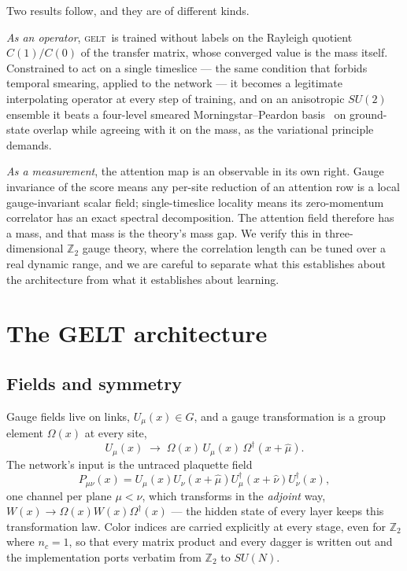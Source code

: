 \documentclass[aps,prl,reprint,superscriptaddress,nofootinbib]{revtex4-2}
\newcommand{\Zt}{\mathbb{Z}_2}
\newcommand{\GELT}{\textsc{gelt}}
\begin{document}
Two results follow, and they are of different kinds.

\emph{As an operator}, \GELT\ is trained without labels on the Rayleigh quotient
$C(1)/C(0)$ of the transfer matrix, whose converged value is the mass itself.
Constrained to act on a single timeslice --- the same condition that forbids
temporal smearing, applied to the network --- it becomes a legitimate
interpolating operator at every step of training, and on an anisotropic $SU(2)$
ensemble it beats a four-level smeared Morningstar--Peardon
basis~\cite{MorningstarPeardon1999} on ground-state overlap while agreeing with
it on the mass, as the variational principle demands.

\emph{As a measurement}, the attention map is an observable in its own right.
Gauge invariance of the score means any per-site reduction of an attention row
is a local gauge-invariant scalar field; single-timeslice locality means its
zero-momentum correlator has an exact spectral decomposition. The attention
field therefore has a mass, and that mass is the theory's mass gap. We verify
this in three-dimensional $\Zt$ gauge theory, where the correlation length can be
tuned over a real dynamic range, and we are careful to separate what this
establishes about the architecture from what it establishes about learning.

\section{The GELT architecture}
\label{sec:arch}

\subsection{Fields and symmetry}

Gauge fields live on links, $U_\mu(x)\in G$, and a gauge transformation is a
group element $\Omega(x)$ at every site,
\begin{equation}
  U_\mu(x)\;\longrightarrow\;\Omega(x)\,U_\mu(x)\,\Omega^\dagger(x+\hat\mu).
  \label{eq:gaugetrafo}
\end{equation}
The network's input is the untraced plaquette field
\begin{equation}
  P_{\mu\nu}(x)=U_\mu(x)U_\nu(x{+}\hat\mu)U_\mu^\dagger(x{+}\hat\nu)U_\nu^\dagger(x),
\end{equation}
one channel per plane $\mu<\nu$, which transforms in the \emph{adjoint} way,
$W(x)\to\Omega(x)W(x)\Omega^\dagger(x)$ --- the hidden state of every layer keeps
this transformation law. Color indices are carried explicitly at every stage,
even for $\Zt$ where $n_c=1$, so that every matrix product and every dagger is
written out and the implementation ports verbatim from $\Zt$ to $SU(N)$.
\end{document}
